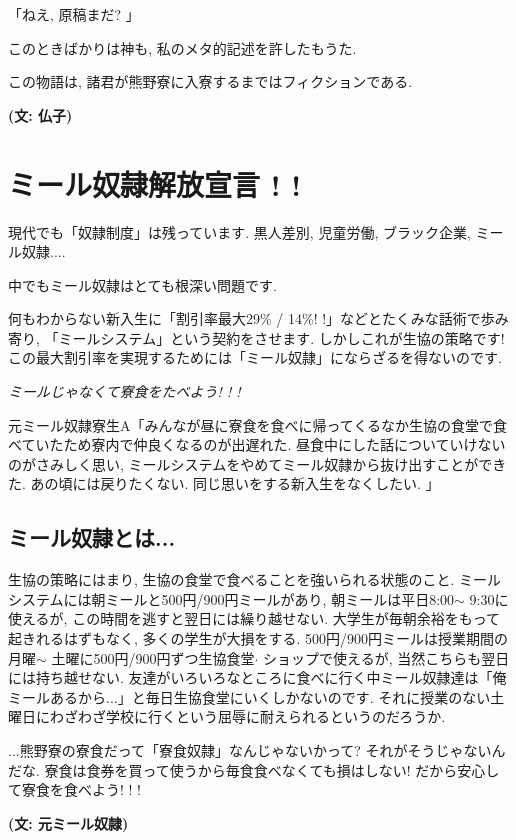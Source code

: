\documentclass[10pt,b5jsbook,dvips,dvipdfmx,openany]{jsbook}
\theoremstyle{definition}
\begin{document}
	「ねえ, 原稿まだ? 」

	このときばかりは神も, 私のメタ的記述を許したもうた.

	この物語は, 諸君が熊野寮に入寮するまではフィクションである.

{\bf (文: 仏子)}


	\section{ミール奴隷解放宣言 ! !}

	現代でも「奴隷制度」は残っています. 黒人差別, 児童労働, ブラック企業, ミール奴隷....

	中でもミール奴隷はとても根深い問題です.

	何もわからない新入生に「割引率最大29\% / 14\%! !」などとたくみな話術で歩み寄り, 「ミールシステム」という契約をさせます. しかしこれが生協の策略です! この最大割引率を実現するためには「ミール奴隷」にならざるを得ないのです.

	\emph{\LARGE  ミールじゃなくて寮食をたべよう! ! ! }


	元ミール奴隷寮生A「みんなが昼に寮食を食べに帰ってくるなか生協の食堂で食べていたため寮内で仲良くなるのが出遅れた. 昼食中にした話についていけないのがさみしく思い, ミールシステムをやめてミール奴隷から抜け出すことができた. あの頃には戻りたくない. 同じ思いをする新入生をなくしたい. 」

		\subsection{ミール奴隷とは...}
		生協の策略にはまり, 生協の食堂で食べることを強いられる状態のこと. ミールシステムには朝ミールと500円/900円ミールがあり, 朝ミールは平日8:00$ \sim $ 9:30に使えるが, この時間を逃すと翌日には繰り越せない. 大学生が毎朝余裕をもって起きれるはずもなく, 多くの学生が大損をする. 500円/900円ミールは授業期間の月曜$ \sim $ 土曜に500円/900円ずつ生協食堂$ \cdot $ ショップで使えるが, 当然こちらも翌日には持ち越せない. 友達がいろいろなところに食べに行く中ミール奴隷達は「俺ミールあるから...」と毎日生協食堂にいくしかないのです. それに授業のない土曜日にわざわざ学校に行くという屈辱に耐えられるというのだろうか.

		...熊野寮の寮食だって「寮食奴隷」なんじゃないかって?
それがそうじゃないんだな. 寮食は食券を買って使うから毎食食べなくても損はしない! だから安心して寮食を食べよう! ! !

{\bf  (文: 元ミール奴隷)}

\end{document}
